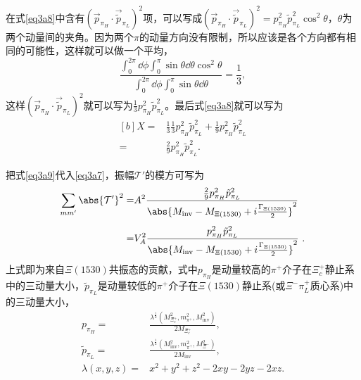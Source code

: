 在式\eqref{eq3a8}中含有$(\vec{p}_{\pi_{H}}\cdot\vec{\tilde{p}}_{\pi_{L}})^2$项，可以写成$(\vec{p}_{\pi_{H}}\cdot\vec{\tilde{p}}_{\pi_{L}})^2=p_{\pi_{H}}^2\tilde{p}_{\pi_{L}}^2\cos^2\theta$，$\theta$为两个动量间的夹角。因为两个$\pi$的动量方向没有限制，所以应该是各个方向都有相同的可能性，这样就可以做一个平均，
\begin{equation}
	\frac{\int_{0}^{2\pi}\dd{\phi}\int_{0}^{\pi}\sin\theta\dd{\theta}\cos^2\theta}{\int_{0}^{2\pi}\dd{\phi}\int_{0}^{\pi}\sin\theta\dd{\theta}}=\frac{1}{3},
\end{equation}
这样$(\vec{p}_{\pi_{H}}\cdot\vec{\tilde{p}}_{\pi_{L}})^2$就可以写为$\frac{1}{3}p_{\pi_{H}}^2\tilde{p}_{\pi_{L}}^2$。最后式\eqref{eq3a8}就可以写为
\begin{equation}
\label{eq3a9}
\begin{aligned}[b]
	X=&\frac{1}{3}\frac{1}{3}p_{\pi_{H}}^2\tilde{p}_{\pi_{L}}^2+\frac{1}{9}p_{\pi_{H}}^2\tilde{p}_{\pi_{L}}^2\\[1ex]
	=&\frac{2}{9}p_{\pi_{H}}^2\tilde{p}_{\pi_{L}}^2.
\end{aligned}
\end{equation}\par
把式\eqref{eq3a9}代入\eqref{eq3a7}，振幅$\mathcal{T}'$的模方可写为
\begin{equation}
\label{eq331}
\begin{aligned}[b]
	\sum_{mm'}\abs{\mathcal{T}'}^2=&A^2\frac{\frac{2}{9}p_{\pi_{H}}^2\tilde{p}_{\pi_{L}}^2 }{\abs{M_{\text{inv}}-M_{\Xi(1530)}+i\frac{\Gamma_{\Xi(1530)}}{2}}^2}\\[1ex]
	=&V_A^2\frac{p_{\pi_{H}}^2\tilde{p}_{\pi_{L}}^2}{\abs{M_{\text{inv}}-M_{\Xi(1530)}+i\frac{\Gamma_{\Xi(1530)}}{2}}^2}\ .
\end{aligned}
\end{equation}
上式即为来自$\Xi(1530)$共振态的贡献，式中$p_{\pi_{H}}$是动量较高的$\pi^{+}$介子在$\Xi_{c}^{+}$静止系中的三动量大小，$\tilde{p}_{\pi_{L}}$是动量较低的$\pi^{+}$介子在$\Xi(1530)$静止系(或$\Xi^{-}\pi_{L}^{+}$质心系)中的三动量大小，
\begin{align}
	p_{\pi_{H}}=&\frac{\lambda^{\frac{1}{2}}(M_{\Xi_{c}^{+}}^2,m_{\pi^{+}}^2,M_{\text{inv}}^2)}{2M_{\Xi_{c}^{+}}},\\[1ex]
	\tilde{p}_{\pi_{L}}=&\frac{\lambda^{\frac{1}{2}}(M_{\text{inv}}^2,m_{\pi^{+}}^2,M_{\Xi^{-}}^2)}{2M_{\text{inv}}},\\[1ex]
	\lambda(x,y,z)=&x^2+y^2+z^2-2xy-2yz-2xz.
\end{align}
